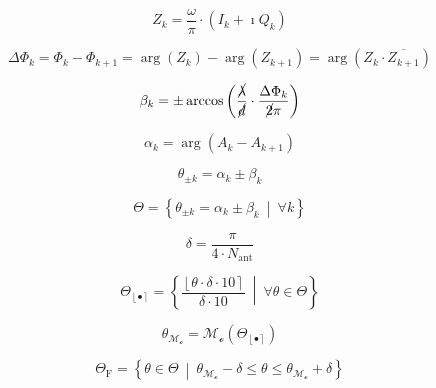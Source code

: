 \begin{equation} %
    Z_k = \frac{\omega}{\pi}\cdot\left(I_k + \imath Q_k\right)
\end{equation}

\begin{equation} %
    \Delta\Phi_{k} =
    \Phi_{k} - \Phi_{k+1} =
    \arg\left(Z_{k}\right) - \arg\left(Z_{k+1}\right) =
    \arg\left(Z_{k} \cdot \overline{Z_{k+1}}\right)
\end{equation}

\begin{equation} %
    \beta_{k} = \pm \arccos\left(\frac{\cancel{\lambda}}{\cancel{d}}\cdot\frac{\Delta\Phi_{k}}{\cancel{2}\pi}\right)
\end{equation}

\begin{equation} %
	\alpha_{k} = \arg\left( A_{k} - A_{k+1} \right)
\end{equation}

\begin{equation} %
	\theta_{\pm k} = \alpha_{k}\pm \beta_{k}
\end{equation}

\begin{equation} %
	\Theta = \left\{\theta_{\pm k}=\alpha_{k}\pm \beta_{k} ~\middle\vert~ \forall k\right\}
\end{equation}

\begin{equation} %
    \delta = \frac{\pi}{4\cdot N_\text{ant}}
\end{equation}

\begin{equation} %
    \Theta_{\left\lfloor\bullet\right\rceil} = \left\{\frac{\left\lfloor\theta\cdot \delta\cdot 10 \right\rceil}{\delta\cdot 10} ~\middle\vert~ \forall \theta \in \Theta  \right\}
\end{equation}

\begin{equation} %
    \theta_\mathcal{M_o} = \operatorname{\mathcal{M_o}}\left( \Theta_{\left\lfloor\bullet\right\rceil}  \right)
\end{equation}

\begin{equation} %
    \Theta_\text{F} = \left\{\theta \in \Theta  ~\middle\vert~
    \theta_\mathcal{M_o} - \delta \leq \theta \leq \theta_\mathcal{M_o} + \delta\right\}
\end{equation}

